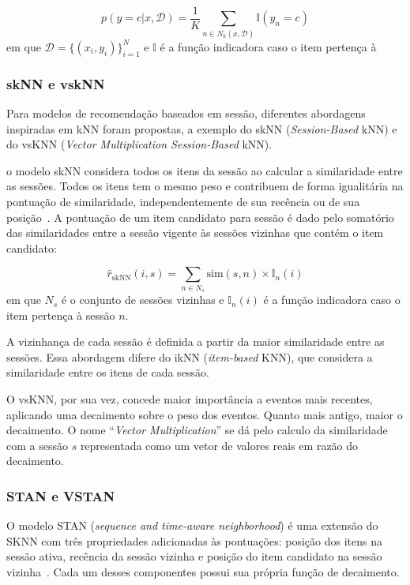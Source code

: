 \begin{equation}
    p(y=c|x, \mathcal{D}) = \frac{1}{K} \sum_{n \in N_k (x, \mathcal{D})} \mathbb{I}(y_n = c)
\end{equation}
em que $\mathcal{D} = \{(x_i, y_i )\}^{N}_{i=1}$ e $\mathbb{I}$ é a função
indicadora caso o item pertença à 

\subsubsection{skNN e vskNN}
Para modelos de recomendação baseados em sessão, diferentes abordagens inspiradas em kNN
foram propostas, a exemplo do skNN (\textit{Session-Based} kNN) e do vsKNN
(\textit{Vector Multiplication Session-Based} kNN).

o modelo skNN considera todos os itens da sessão ao calcular a similaridade
entre as sessões. Todos os itens tem o mesmo peso e contribuem de forma
igualitária na pontuação de similaridade, independentemente de sua
recência ou de sua posição~\cite{ludewig_2019}. A pontuação de um item candidato para sessão
é dado pelo somatório das similaridades entre a sessão vigente às sessões vizinhas
que contém o item candidato:

\begin{equation}
    \hat{r}_{\text{skNN}}(i, s) = \sum_{n \in N_s} \text{sim}(s,n) \times \mathbb{I}_n(i)
\end{equation}
em que $N_s$ é o conjunto de sessões vizinhas e $\mathbb{I}_n(i)$ é a função
indicadora caso o item pertença à sessão $n$.

A vizinhança de cada sessão é definida a partir da maior
similaridade entre as sessões. Essa abordagem difere do ikNN
(\textit{item-based} KNN), que considera a similaridade entre os itens de cada
sessão. 

O vsKNN, por sua vez, concede maior importância a eventos mais recentes,
aplicando uma decaimento sobre o peso dos eventos. Quanto mais antigo, maior o
decaimento. O nome ``\textit{Vector Multiplication}'' se dá pelo calculo da
similaridade com a sessão $s$ representada como um vetor de valores reais em
razão do decaimento.


\subsubsection{STAN e VSTAN}
O modelo STAN (\textit{sequence and time-aware neighborhood}) é uma extensão do
SKNN com três propriedades adicionadas às pontuações: posição dos itens na
sessão ativa, recência da sessão vizinha e posição do item candidato na sessão
vizinha~\cite{garg2019sequence}. Cada um desses componentes possui sua própria função de decaimento.

